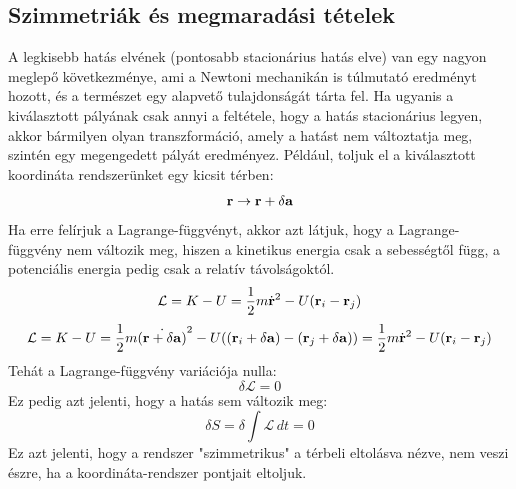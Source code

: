 \documentclass[../main.tex]{subfiles}
\begin{document}
\subsection{Szimmetriák és megmaradási tételek}
A legkisebb hatás elvének (pontosabb stacionárius hatás elve) van egy nagyon meglepő következménye, ami a Newtoni mechanikán is túlmutató eredményt hozott, és a természet egy alapvető tulajdonságát tárta fel.
Ha ugyanis a kiválasztott pályának csak annyi a feltétele, hogy a hatás stacionárius legyen, akkor bármilyen olyan transzformáció, amely a hatást nem változtatja meg, szintén egy megengedett pályát eredményez.
Például, toljuk el a kiválasztott koordináta rendszerünket egy kicsit térben:
\begin{equation}
    \bold{r} \to \bold{r} + \delta \bold{a}
\end{equation}
Ha erre felírjuk a Lagrange-függvényt, akkor azt látjuk, hogy a Lagrange-függvény nem változik meg, hiszen a kinetikus energia csak a sebességtől függ, a potenciális energia pedig csak a relatív távolságoktól.
\begin{equation}
    \mathcal{L} = K - U = \frac{1}{2}m \dot{\bold{r}}^2 - U(\bold{r}_i - \bold{r}_j)
\end{equation}
\begin{equation}
    \mathcal{L} = K - U = \frac{1}{2}m \dot{(\bold{r} + \delta \bold{a})}^2 - U((\bold{r}_i + \delta \bold{a}) - (\bold{r}_j + \delta \bold{a})) = \frac{1}{2}m \dot{\bold{r}}^2 - U(\bold{r}_i - \bold{r}_j)
\end{equation}
Tehát a Lagrange-függvény variációja nulla:
\begin{equation}
    \delta \mathcal{L} = 0
\end{equation}
Ez pedig azt jelenti, hogy a hatás sem változik meg:
\begin{equation}
    \delta S = \delta \int \mathcal{L} \, dt = 0
\end{equation}
Ez azt jelenti, hogy a rendszer "szimmetrikus" a térbeli eltolásva nézve, nem veszi észre, ha a koordináta-rendszer pontjait eltoljuk. 
\end{document}
